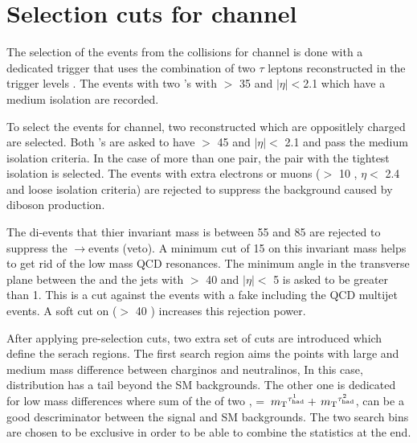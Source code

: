 \section{\texorpdfstring{Selection cuts for \Tau\Tau channel}{Selection cuts for tau-tau channel}}
\label{sect:tauTauCuts}
The selection of the events from the collisions for \Tau\Tau channel
is done with a dedicated trigger that uses the combination of 
two $\tau$ leptons reconstructed in the trigger levels \cite{CMS:2013hoa,Chatrchyan:2012xi,Chatrchyan:2011nv}.
The events with two \Tau's with \PT $>$ 35 \GeV and $|\eta|<$2.1 which have a medium isolation are recorded. 

To select the events for \Tau\Tau channel, two reconstructed \Tau which are oppositlely charged are selected. Both \Tau's are asked to 
have \PT $>$ 45 \GeV and $|\eta| <$ 2.1 and pass the medium isolation criteria.
In the case of more than one pair, the pair with the tightest isolation 
is selected.
The events with extra electrons or muons (\PT $>$ 10 \GeV, $\eta <$ 2.4 and loose isolation criteria) 
are rejected to suppress %
the background caused by diboson production.

The di-\Tau events that thier invariant mass is between 55 and 85 \GeV are rejected to suppress the \Z$\rightarrow$\Tau\Tau events (\Z veto).
A minimum cut of 15 \GeV on this invariant mass helps to get rid of the low mass
QCD resonances. The minimum angle in the transverse plane between the \MET and the jets with \PT $>$ 40 \GeV and $|\eta| <$ 5 
is asked to be greater than 1. This is a cut against the events with a fake \MET including the QCD multijet events. A soft cut on 
\mttwo ($>$ 40 \GeV) increases this rejection power.

After applying pre-selection cuts, two extra set of cuts are introduced which define the serach regions.
The first search region aims the points with large and medium mass difference between charginos and neutralinos, In this case,  \mttwo  distribution has a tail beyond the 
SM backgrounds. 
The other one is dedicated for low mass differences where sum of the \mt of two \Tau, \SumMT = $\,{m_{\rm T}}^{\tau_{\rm had}^1} + \,{m_{\rm T}}^{\tau_{\rm had}^2}$, can be a good descriminator between the signal and SM backgrounds.
The two search bins are chosen to be exclusive in order 
to be able to combine the statistics at the end. 

